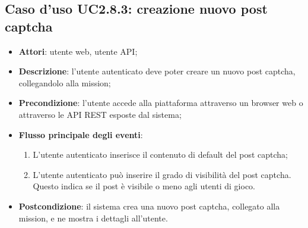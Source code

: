 \subsection{Caso d'uso UC2.8.3: creazione nuovo post captcha}
\begin{itemize}
\item \textbf{Attori}: utente web, utente API;
\item \textbf{Descrizione}: l'utente autenticato deve poter creare un nuovo post captcha, collegandolo alla mission; 
      \item \textbf{Precondizione}: l'utente accede alla piattaforma attraverso un browser web o attraverso le API REST esposte dal sistema;

        \item \textbf{Flusso principale degli eventi}:
          \begin{enumerate}
          \item L'utente autenticato inserisce il contenuto di default del post captcha;
          \item L'utente autenticato può inserire il grado di visibilità del post captcha. Questo indica se il post è visibile o meno agli utenti di gioco.

      \end{enumerate}
    \item \textbf{Postcondizione}: il sistema crea una nuovo post captcha, collegato alla mission, e ne mostra i dettagli all'utente.
  \end{itemize}
\hypertarget{UC2.8.4}{}
